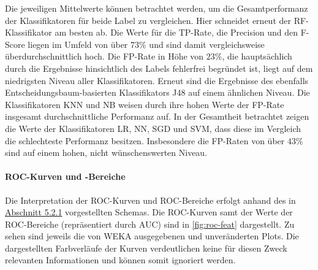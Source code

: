 Die jeweiligen Mittelwerte können betrachtet werden, um die Gesamtperformanz der Klassifikatoren für beide Label zu vergleichen. Hier schneidet erneut der RF-Klassifikator am besten ab. Die Werte für die TP-Rate, die Precision und den F-Score liegen im Umfeld von über $73\%$ und sind damit vergleichsweise überdurchschnittlich hoch. Die FP-Rate in Höhe von $23\%$, die hauptsächlich durch die Ergebnisse hinsichtlich des Labels \glqq fehlerfrei\grqq{} begründet ist, liegt auf dem niedrigsten Niveau aller Klassifikatoren. Erneut sind die Ergebnisse des ebenfalls Entscheidungsbaum-basierten Klassifikators J48 auf einem ähnlichen Niveau. Die Klassifikatoren KNN und NB weisen durch ihre hohen Werte der FP-Rate insgesamt durchschnittliche Performanz auf. In der Gesamtheit betrachtet zeigen die Werte der Klassifikatoren LR, NN, SGD und SVM, dass diese im Vergleich die schlechteste Performanz besitzen. Insbesondere die FP-Raten von über $43\%$ sind auf einem hohen, nicht wünschenswerten Niveau. 

\paragraph{ROC-Kurven und -Bereiche}
Die Interpretation der ROC-Kurven und ROC-Bereiche erfolgt anhand des in \hyperref[roc-def]{Abschnitt 5.2.1} vorgestellten Schemas. Die ROC-Kurven samt der Werte der ROC-Bereiche (repräsentiert durch \glqq AUC\grqq{}) sind in \autoref{fig:roc-feat}  dargestellt. Zu sehen sind jeweils die von WEKA ausgegebenen und unveränderten Plots. Die dargestellten Farbverläufe der Kurven verdeutlichen keine für diesen Zweck relevanten Informationen und können somit ignoriert werden.

